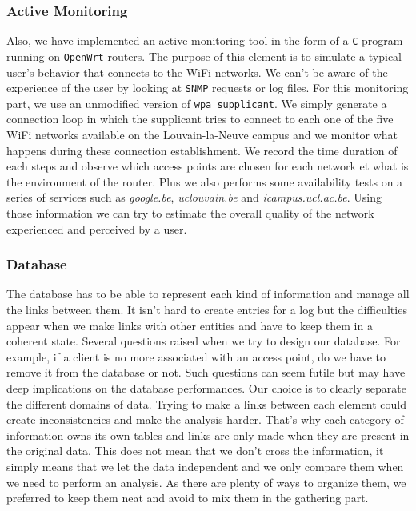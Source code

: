 \subsubsection{Active Monitoring}
Also, we have implemented an active monitoring tool in the form of a \texttt{C} program running on \texttt{OpenWrt} routers. The purpose of this element is to simulate a typical user's behavior that connects to the WiFi networks. We can't be aware of the experience of the user by looking at \texttt{SNMP} requests or log files. For this monitoring part, we use an unmodified version of \texttt{wpa\_supplicant}. We simply generate a connection loop in which the supplicant tries to connect to each one of the five WiFi networks available on the Louvain-la-Neuve campus and we monitor what happens during these connection establishment. We record the time duration of each steps and observe which access points are chosen for each network et what is the environment of the router. Plus we also performs some availability tests on a series of services such as \textit{google.be}, \textit{uclouvain.be} and \textit{icampus.ucl.ac.be}. Using those information we can try to estimate the overall quality of the network experienced and perceived by a user.

\subsubsection{Database}
The database has to be able to represent each kind of information and manage all the links between them. It isn't hard to create entries for a log but the difficulties appear when we make links with other entities and have to keep them in a coherent state. Several questions raised when we try to design our database. For example, if a client is no more associated with an access point, do we have to remove it from the database or not. Such questions can seem futile but may have deep implications on the database performances. Our choice is to clearly separate the different domains of data. Trying to make a links between each element could create inconsistencies and make the analysis harder. That's why each category of information owns its own tables and links are only made when they are present in the original data. This does not mean that we don't cross the information, it simply means that we let the data independent and we only compare them when we need to perform an analysis. As there are plenty of ways to organize them, we preferred to keep them neat and avoid to mix them in the gathering part.

